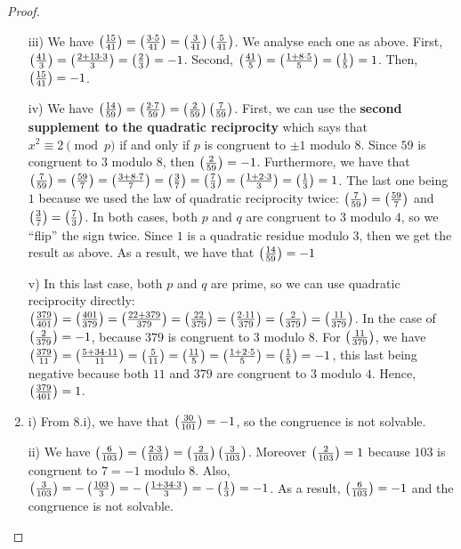 \begin{proof}
\begin{enumerate}
     iii) We have $\left( \frac{15}{41}\right)= \left( \frac{3\cdot 5}{41}\right)= \left( \frac{3}{41}\right)\left( \frac{5}{41}\right)$. We analyse each one as above. First, $\left( \frac{41}{3}\right)= \left( \frac{2+13\cdot 3}{3}\right)= \left( \frac{2}{3}\right)=-1$. Second, $\left( \frac{41}{5}\right)= \left( \frac{1+8\cdot 5}{5}\right)= \left( \frac{1}{5}\right)= 1$. Then,  $\left( \frac{15}{41}\right)=-1$.

     iv) We have $\left( \frac{14}{59}\right)= \left( \frac{2\cdot 7}{59}\right)= \left( \frac{2}{59}\right)\left( \frac{7}{59}\right)$. First, we can use the \textbf{second supplement to the quadratic reciprocity} which says that $x^{2}\equiv 2\pmod{p}$ if and only if $p$ is congruent to $\pm 1$ modulo $8$. Since $59$ is congruent to $3$ modulo $8$, then $\left( \frac{2}{59}\right)=-1$. Furthermore, we have that $\left( \frac{7}{59}\right)= \left( \frac{59}{7}\right)= \left( \frac{3+8\cdot 7}{7}\right)= \left( \frac{3}{7}\right)= \left( \frac{7}{3}\right)= \left( \frac{1+2\cdot 3}{3}\right)= \left( \frac{1}{3}\right)= 1$. The last one being $1$ because we used the law of quadratic reciprocity twice: $\left( \frac{7}{59}\right)= \left( \frac{59}{7}\right)$ and $\left( \frac{3}{7}\right)= \left( \frac{7}{3}\right)$. In both cases, both $p$ and $q$ are congruent to $3$ modulo $4$, so we ``flip'' the sign twice. Since $1$ is a quadratic residue modulo $3$, then we get the result as above. As a result, we have that $\left( \frac{14}{59}\right)=-1$

     v) In this last case, both $p$ and $q$ are prime, so we can use quadratic reciprocity directly: $\left( \frac{379}{401}\right)= \left( \frac{401}{379}\right)= \left( \frac{22+379}{379}\right)= \left( \frac{22}{379}\right)= \left( \frac{2\cdot 11}{379}\right)= \left( \frac{2}{379}\right)= \left( \frac{11}{379}\right)$. In the case of $\left( \frac{2}{379}\right)=-1$, because $379$ is congruent to $3$ modulo $8$. For $\left( \frac{11}{379}\right)$, we have $\left( \frac{379}{11}\right)= \left( \frac{5+34\cdot 11}{11}\right)= \left( \frac{5}{11}\right)= \left( \frac{11}{5}\right)= \left( \frac{1+2\cdot 5}{5}\right)= \left( \frac{1}{5}\right)= -1$, this last being negative because both $11$ and $379$ are congruent to $3$ modulo $4$. Hence, $\left( \frac{379}{401}\right)=1$.
     \item i) From 8.i), we have that $\left( \frac{30}{101}\right)=-1$, so the congruence is not solvable.

     ii) We have $\left( \frac{6}{103}\right)=\left( \frac{2\cdot 3}{103}\right)= \left( \frac{2}{103}\right)\left( \frac{3}{103}\right)$. Moreover $\left( \frac{2}{103}\right)=1$ because $103$ is congruent to $7=-1$ modulo $8$. Also, $\left( \frac{3}{103}\right)=-\left( \frac{103}{3}\right)= -\left( \frac{1+34\cdot 3}{3}\right)= -\left( \frac{1}{3}\right)= -1$. As a result, $\left( \frac{6}{103}\right)=-1$ and the congruence is not solvable.


\end{enumerate}
\end{proof}
